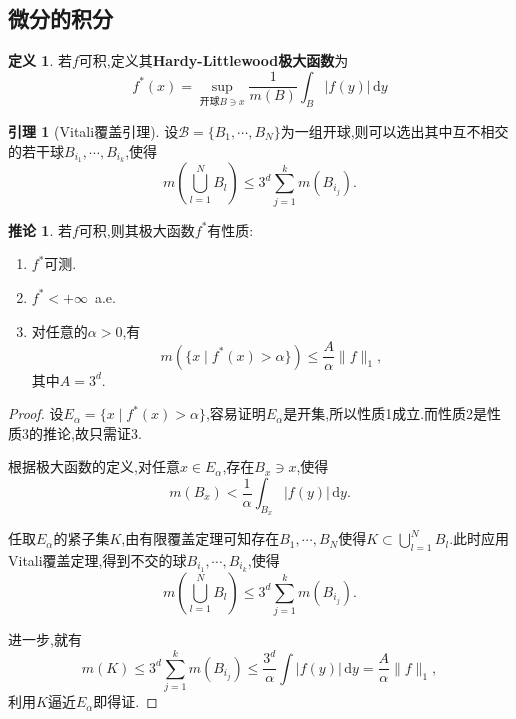 \documentclass{ctexart}
\theoremstyle{definition}
\newtheorem{definition}{定义}
\newtheorem{lemma}{引理}
\newtheorem{corollary}{推论}
\theoremstyle{remark}
\begin{document}
	\subsection{微分的积分}
	
	\begin{definition}
		若$f$可积,定义其\textbf{Hardy-Littlewood极大函数}为
		$$f^*(x)=\sup_{\mbox{开球}B\ni x}{\frac{1}{m(B)}\int_B{|f(y)|\,\mathrm{d}y}}$$
	\end{definition}
	\begin{lemma}[Vitali覆盖引理]
		设$\mathcal{B}=\{B_1,\cdots,B_N\}$为一组开球,则可以选出其中互不相交的若干球$B_{i_1},\cdots,B_{i_k}$,使得
		$$m\left(\bigcup_{l=1}^N{B_l}\right)\le 3^d\sum_{j=1}^k{m(B_{i_j})}.$$
	\end{lemma}
	\begin{corollary}
		若$f$可积,则其极大函数$f^*$有性质:
		\begin{enumerate}
			\item $f^*$可测.
			\item $f^*<+\infty$\ a.e.
			\item 对任意的$\alpha>0$,有
			$$m(\{x\mid f^*(x)>\alpha\})\le\frac{A}{\alpha}\|f\|_1,$$
			其中$A=3^d$.
		\end{enumerate}
	\end{corollary}
	\begin{proof}
		设$E_\alpha=\{x\mid f^*(x)>\alpha\}$,容易证明$E_\alpha$是开集,所以性质1成立.而性质2是性质3的推论,故只需证3.
		
		根据极大函数的定义,对任意$x\in E_\alpha$,存在$B_x\ni x$,使得
		$$m(B_x)<\frac{1}{\alpha}{\int_{B_x}{|f(y)|\,\mathrm{d}y}}.$$
		
		任取$E_\alpha$的紧子集$K$,由有限覆盖定理可知存在$B_1,\cdots,B_N$使得$K\subset\bigcup_{l=1}^N{B_l}$.此时应用Vitali覆盖定理,得到不交的球$B_{i_1},\cdots,B_{i_k}$,使得
		$$m\left(\bigcup_{l=1}^N{B_l}\right)\le 3^d\sum_{j=1}^k{m(B_{i_j})}.$$
		
		进一步,就有
		$$m(K)\le 3^d\sum_{j=1}^k{m(B_{i_j})}\le\frac{3^d}{\alpha}\int{|f(y)|\,\mathrm{d}y}=\frac{A}{\alpha}\|f\|_1,$$
		利用$K$逼近$E_\alpha$即得证.
	\end{proof}
	
\end{document}
